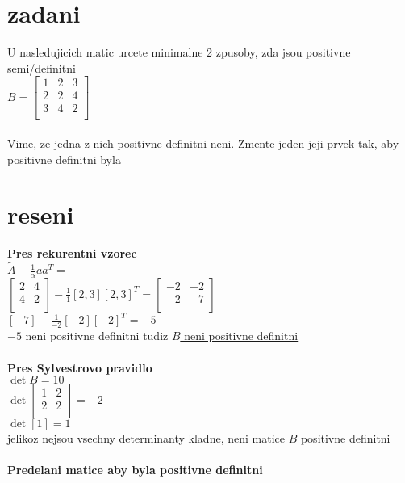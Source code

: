 \documentclass[a4paper]{article}
\def\doubleunderline#1{\underline{\underline{#1}}}
\begin{document}
\section*{zadani}
U nasledujicich matic urcete minimalne 2 zpusoby, zda jsou positivne
semi/definitni\\
$B=
\begin{bmatrix}
	1 & 2 & 3\\
	2 & 2 & 4\\
	3 & 4 & 2\\
\end{bmatrix}
$\\
\\
Vime, ze jedna z nich positivne definitni neni. Zmente jeden jeji prvek tak, aby positivne
definitni byla
 
\section*{reseni}
\textbf{Pres rekurentni vzorec}\\
$\tilde{A}-\frac{1}{\alpha}aa^T=$\\
$
\begin{bmatrix}
	2 &  4\\
	4 &  2\\
\end{bmatrix}
-\frac{1}{1}[2,3][2,3]^T
=
\begin{bmatrix}
	-2 & -2 \\
	-2 & -7 \\
\end{bmatrix}
$\\
$
[-7]-\frac{1}{-2}[-2][-2]^T
=
-5
$\\
$-5$ neni positivne definitni tudiz \doubleunderline{$B$ neni positivne definitni}\\
\\
\textbf{Pres Sylvestrovo pravidlo}\\
$\det B = 10$\\
$\det 
\begin{bmatrix}
	1 &  2\\
	2 &  2\\
\end{bmatrix}
= -2$\\
$\det [1] = 1$\\
jelikoz nejsou vsechny determinanty kladne, neni matice $B$ positivne definitni\\
\\
\textbf{Predelani matice aby byla positivne definitni}\\
\end{document}
